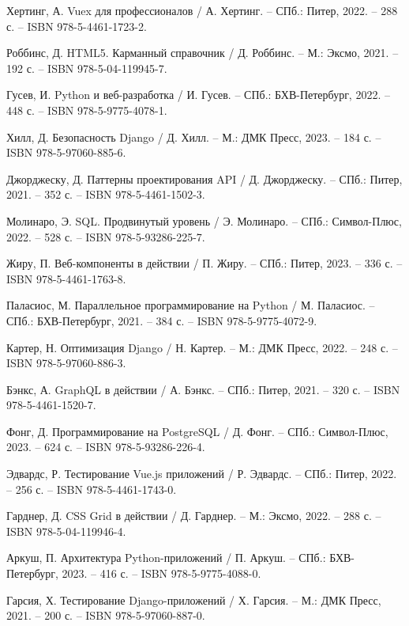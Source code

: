 \begin{thebibliography}{9}
	 Хертинг, А. Vuex для профессионалов / А. Хертинг. – СПб.: Питер, 2022. – 288 с. – ISBN 978-5-4461-1723-2.
	
	 Роббинс, Д. HTML5. Карманный справочник / Д. Роббинс. – М.: Эксмо, 2021. – 192 с. – ISBN 978-5-04-119945-7.
	
	 Гусев, И. Python и веб-разработка / И. Гусев. – СПб.: БХВ-Петербург, 2022. – 448 с. – ISBN 978-5-9775-4078-1.
	
	 Хилл, Д. Безопасность Django / Д. Хилл. – М.: ДМК Пресс, 2023. – 184 с. – ISBN 978-5-97060-885-6.
	
	 Джорджеску, Д. Паттерны проектирования API / Д. Джорджеску. – СПб.: Питер, 2021. – 352 с. – ISBN 978-5-4461-1502-3.
	
	 Молинаро, Э. SQL. Продвинутый уровень / Э. Молинаро. – СПб.: Символ-Плюс, 2022. – 528 с. – ISBN 978-5-93286-225-7.
	
	 Жиру, П. Веб-компоненты в действии / П. Жиру. – СПб.: Питер, 2023. – 336 с. – ISBN 978-5-4461-1763-8.
	
	 Паласиос, М. Параллельное программирование на Python / М. Паласиос. – СПб.: БХВ-Петербург, 2021. – 384 с. – ISBN 978-5-9775-4072-9.
	
	 Картер, Н. Оптимизация Django / Н. Картер. – М.: ДМК Пресс, 2022. – 248 с. – ISBN 978-5-97060-886-3.
	
	 Бэнкс, А. GraphQL в действии / А. Бэнкс. – СПб.: Питер, 2021. – 320 с. – ISBN 978-5-4461-1520-7.
	
	 Фонг, Д. Программирование на PostgreSQL / Д. Фонг. – СПб.: Символ-Плюс, 2023. – 624 с. – ISBN 978-5-93286-226-4.
	
	 Эдвардс, Р. Тестирование Vue.js приложений / Р. Эдвардс. – СПб.: Питер, 2022. – 256 с. – ISBN 978-5-4461-1743-0.
	
	 Гарднер, Д. CSS Grid в действии / Д. Гарднер. – М.: Эксмо, 2022. – 288 с. – ISBN 978-5-04-119946-4.
	
	 Аркуш, П. Архитектура Python-приложений / П. Аркуш. – СПб.: БХВ-Петербург, 2023. – 416 с. – ISBN 978-5-9775-4088-0.
	
	 Гарсия, Х. Тестирование Django-приложений / Х. Гарсия. – М.: ДМК Пресс, 2021. – 200 с. – ISBN 978-5-97060-887-0.
	

\end{thebibliography}
